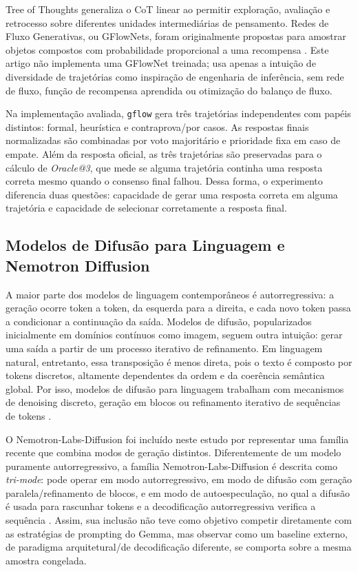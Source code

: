 \documentclass[12pt]{article}
\makeatletter
\newcommand{\oracle}{\mbox{\textit{Oracle@3}}}
\makeatother
\begin{document}
Tree of Thoughts \cite{yao2023tot} generaliza o CoT linear ao permitir exploração, avaliação e retrocesso sobre diferentes unidades intermediárias de pensamento. Redes de Fluxo Generativas, ou GFlowNets, foram originalmente propostas para amostrar objetos compostos com probabilidade proporcional a uma recompensa \cite{bengio2021}. Este artigo não implementa uma GFlowNet treinada; usa apenas a intuição de diversidade de trajetórias como inspiração de engenharia de inferência, sem rede de fluxo, função de recompensa aprendida ou otimização do balanço de fluxo.

Na implementação avaliada, \texttt{gflow} gera três trajetórias independentes com papéis distintos: formal, heurística e contraprova/por casos. As respostas finais normalizadas são combinadas por voto majoritário e prioridade fixa em caso de empate. Além da resposta oficial, as três trajetórias são preservadas para o cálculo de \oracle{}, que mede se alguma trajetória continha uma resposta correta mesmo quando o consenso final falhou. Dessa forma, o experimento diferencia duas questões: capacidade de gerar uma resposta correta em alguma trajetória e capacidade de selecionar corretamente a resposta final.

\subsection{Modelos de Difusão para Linguagem e Nemotron Diffusion}

A maior parte dos modelos de linguagem contemporâneos é autorregressiva: a geração ocorre token a token, da esquerda para a direita, e cada novo token passa a condicionar a continuação da saída. Modelos de difusão, popularizados inicialmente em domínios contínuos como imagem, seguem outra intuição: gerar uma saída a partir de um processo iterativo de refinamento. Em linguagem natural, entretanto, essa transposição é menos direta, pois o texto é composto por tokens discretos, altamente dependentes da ordem e da coerência semântica global. Por isso, modelos de difusão para linguagem trabalham com mecanismos de denoising discreto, geração em blocos ou refinamento iterativo de sequências de tokens \cite{yu2025discretediffusion,ye2025dream}.

O Nemotron-Labs-Diffusion foi incluído neste estudo por representar uma família recente que combina modos de geração distintos. Diferentemente de um modelo puramente autorregressivo, a família Nemotron-Labs-Diffusion é descrita como \textit{tri-mode}: pode operar em modo autorregressivo, em modo de difusão com geração paralela/refinamento de blocos, e em modo de autoespeculação, no qual a difusão é usada para rascunhar tokens e a decodificação autorregressiva verifica a sequência \cite{nemotronlabsdiffusion2026}. Assim, sua inclusão não teve como objetivo competir diretamente com as estratégias de prompting do Gemma, mas observar como um baseline externo, de paradigma arquitetural/de decodificação diferente, se comporta sobre a mesma amostra congelada.
\end{document}
